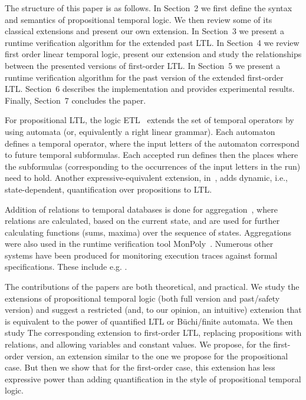 The structure of this paper is as follows. In Section~2 we first define the syntax and semantics of propositional temporal logic. We then review some of its classical extensions and present our own extension. In Section~3 we present a runtime verification algorithm for the extended past LTL. In Section~4 we review first order linear temporal logic, present our extension and study the relationships between the presented versions of first-order LTL. In Section~5 we present a runtime verification algorithm for the past version of the extended first-order LTL. Section~6 describes the implementation and provides experimental results. Finally, Section~7 concludes the paper.


\vspace{1ex}
For propositional LTL, the logic ETL~\cite{WVS,Wolper} extends
the set of temporal operators 
by using automata (or, equivalently a right linear grammar). Each automaton defines a temporal operator,
where the input letters of the automaton correspond to future temporal subformulas. Each accepted run defines then the places
where the subformulas (corresponding to the occurrences of the input letters in the run) need to hold. Another expressive-equivalent extension, 
in~\cite{Wolper}, adds dynamic, i.e.,
state-dependent, quantification over propositions to LTL.

Addition of relations to temporal databases is done
for aggregation~\cite{Libkin}, where relations are
calculated, based on the current state, and are used for further calculating
functions (sums, maxima) over the sequence of states. Aggregations were also used in the runtime verification tool 
{\sf MonPoly}~\cite{agrebasin}.
%
%
Numerous other systems have been produced for monitoring
execution traces against formal specifications. 
These include e.g. \cite{Meredith2011,larva,Reger2015,halle-beepbeep-ieee-12,LOLA}. 


\iffalse
The contributions of the papers are both theoretical, and
practical. We study the extensions of propositional temporal logic (both full version and past/safety version) and suggest a restricted (and, to our opinion, an intuitive) extension that is equivalent to the power of quantified LTL or B\"{u}chi/finite automata. We then study 
The corresponding extension to first-order LTL, replacing propositions with relations, and allowing variables and constant values. We propose, for the first-order version, an extension similar to the one we propose for the propositional case. But then we show that for the first-order case, this extension has
less expressive power than adding quantification in the style of propositional temporal logic.

